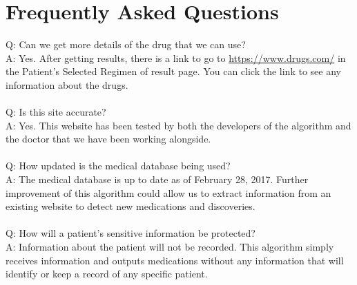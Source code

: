 \documentclass[12pt]{article}
\begin{document}
\section{Frequently Asked Questions}
Q: Can we get more details of the drug that we can use?\\
A: Yes. After getting results, there is a link to go to \url{https://www.drugs.com/} in the Patient’s Selected Regimen of result page. You can click the link to see any information about the drugs.\\\\
Q: Is this site accurate?\\
A: Yes. This website has been tested by both the developers of the algorithm and the doctor that we have been working alongside.\\\\
Q: How updated is the medical database being used?\\
A: The medical database is up to date as of February 28, 2017. Further improvement of this algorithm could allow us to extract information from an existing website to detect new medications and discoveries.\\\\
Q: How will a patient's sensitive information be protected?\\
A: Information about the patient will not be recorded. This algorithm simply receives information and outputs medications without any information that will identify or keep a record of any specific patient.\\\\
\end{document}
